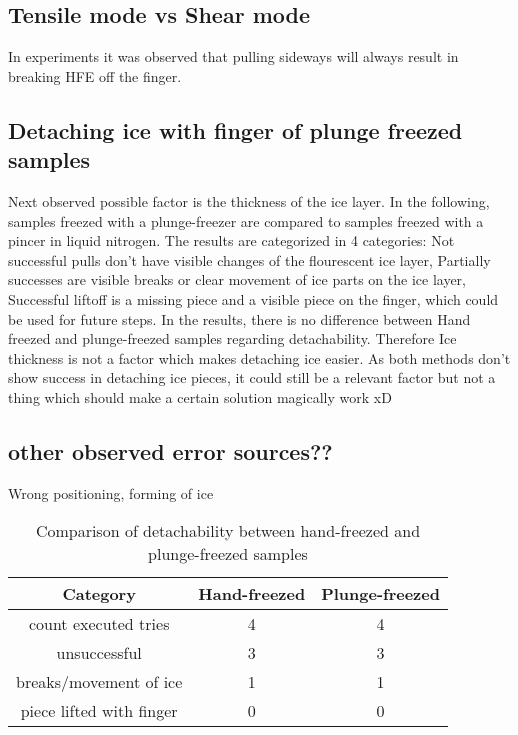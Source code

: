 \subsection{Tensile mode vs Shear mode}

In experiments it was observed that pulling sideways will always result in breaking HFE off the finger.

\subsection{Detaching ice with finger of plunge freezed samples}

Next observed possible factor is the thickness of the ice layer. In the following, samples freezed with a plunge-freezer are compared to samples freezed with a pincer in liquid nitrogen. The results are categorized in 4 categories: Not successful pulls don't have visible changes of the flourescent ice layer, Partially successes are visible breaks or clear movement of ice parts on the ice layer, Successful liftoff is a missing piece and a visible piece on the finger, which could be used for future steps. In the results, there is no difference between Hand freezed and plunge-freezed samples regarding detachability. Therefore Ice thickness is not a factor which makes detaching ice easier. As both methods don't show success in detaching ice pieces, it could still be a relevant factor but not a thing which should make a certain solution magically work xD

\subsection{other observed error sources??}

Wrong positioning, forming of ice

\begin{table}
	\centering
	\begin{tabular}{|c|c|c|}
		\hline
		Category & Hand-freezed & Plunge-freezed \\
		\hline
		\hline
		count executed tries & 4 & 4\\
		\hline
		unsuccessful & 3 & 3\\
		\hline
		breaks/movement of ice & 1 & 1\\
		\hline
		piece lifted with finger & 0 & 0\\
		\hline		
	\end{tabular}
	\caption{Comparison of detachability between hand-freezed and plunge-freezed samples}
\end{table}

